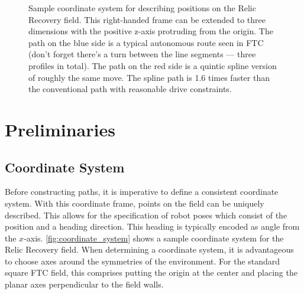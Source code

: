 \documentclass{article}
\begin{document}
\begin{figure}
    \centering

    
    \caption{Sample coordinate system for describing positions on the Relic Recovery field. This right-handed frame can be extended to three dimensions with the positive z-axis protruding from the origin. The path on the blue side is a typical autonomous route seen in FTC (don't forget there's a turn between the line segments --- three profiles in total). The path on the red side is a quintic spline version of roughly the same move. The spline path is 1.6 times faster than the conventional path with reasonable drive constraints.}
    \label{fig:coordinate_system}
\end{figure}

\section{Preliminaries}

\subsection{Coordinate System}
Before constructing paths, it is imperative to define a consistent coordinate system. With this coordinate frame, points on the field can be uniquely described. This allows for the specification of robot poses which consist of the position and a heading direction. This heading is typically encoded as angle from the $x$-axis. \autoref{fig:coordinate_system} shows a sample coordinate system for the Relic Recovery field. When determining a coordinate system, it is advantageous to choose axes around the symmetries of the environment. For the standard square FTC field, this comprises putting the origin at the center and placing the planar axes perpendicular to the field walls.
\end{document}
